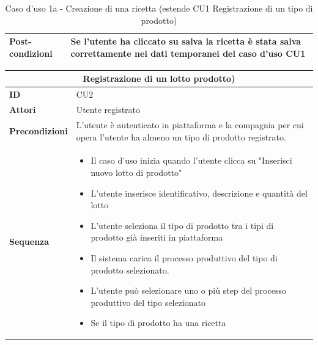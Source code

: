 \documentclass[a4paper,11pt]{article}
\begin{document}
\begin{table}[H]
\begin{tabular}{|m{2cm}|m{10.5cm}|}
    \\ \hline
    \multicolumn{1}{|l|}{\textbf{Post-condizioni}} & Se l'utente ha cliccato su salva la ricetta è stata salva correttamente nei dati temporanei del caso d'uso CU1 \\ \hline
  \end{tabular}
  \caption{Caso d'uso 1a - Creazione di una ricetta (estende CU1 Registrazione di un tipo di prodotto) }
  \label{cu:CU1a}
\end{table}

\begin{table}[H]
  \centering
  \begin{tabular}{|m{2cm}|m{10.5cm}|}
    \hline
    \multicolumn{2}{|c|}{\textbf{Registrazione di un lotto prodotto)}}                                                                                                     \\ \hline
    \multicolumn{1}{|l|}{\textbf{ID}}              & CU2                                                                                                                   \\ \hline
    \multicolumn{1}{|l|}{\textbf{Attori}}          & Utente registrato                                                                                                     \\ \hline
    \multicolumn{1}{|l|}{\textbf{Precondizioni}}   & L'utente è autenticato in piattaforma e la compagnia per cui opera l'utente ha almeno un tipo di prodotto registrato. \\ \hline
    \multicolumn{1}{|l|}{\textbf{Sequenza}}        &
    \begin{itemize}
      \item Il caso d'uso inizia quando l'utente clicca su "Inserisci nuovo lotto di prodotto"
      \item L'utente inserisce identificativo, descrizione e quantità del lotto
      \item L'utente seleziona il tipo di prodotto tra i tipi di prodotto già inseriti in piattaforma
      \item Il sistema carica il processo produttivo del tipo di prodotto selezionato.
      \item L'utente può selezionare uno o più step del processo produttivo del tipo selezionato
      \item Se il tipo di prodotto ha una ricetta


\end{itemize}
\end{tabular}
\end{table}
\end{document}
